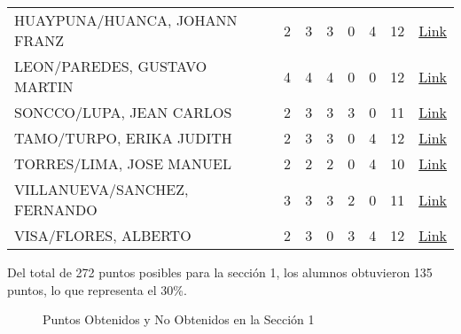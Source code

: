 \documentclass[11pt,fleqn]{book} %
\begin{document}
\begin{table}[]
\begin{tabular}{llllllll}
		HUAYPUNA/HUANCA, JOHANN FRANZ       & 2           & 3           & 3           & 0           & 4           & 12            & \href{https://drive.google.com/open?id=1WYgqT2JCTGtzgXqbM5qQqxSmqwJcihF1}{Link}               \\
		LEON/PAREDES, GUSTAVO MARTIN        & 4           & 4           & 4           & 0           & 0           & 12            & \href{https://drive.google.com/open?id=1WYgqT2JCTGtzgXqbM5qQqxSmqwJcihF1}{Link}               \\
		SONCCO/LUPA, JEAN CARLOS            & 2           & 3           & 3           & 3           & 0           & 11            & \href{https://drive.google.com/open?id=1WYgqT2JCTGtzgXqbM5qQqxSmqwJcihF1}{Link}               \\
		TAMO/TURPO, ERIKA JUDITH            & 2           & 3           & 3           & 0           & 4           & 12            & \href{https://drive.google.com/open?id=1WYgqT2JCTGtzgXqbM5qQqxSmqwJcihF1}{Link}               \\
		TORRES/LIMA, JOSE MANUEL            & 2           & 2           & 2           & 0           & 4           & 10            & \href{https://drive.google.com/open?id=1WYgqT2JCTGtzgXqbM5qQqxSmqwJcihF1}{Link}               \\
		VILLANUEVA/SANCHEZ, FERNANDO & 3           & 3           & 3           & 2           & 0           & 11            & \href{https://drive.google.com/open?id=1WYgqT2JCTGtzgXqbM5qQqxSmqwJcihF1}{Link}               \\
		VISA/FLORES, ALBERTO                & 2           & 3           & 0           & 3           & 4           & 12            & \href{https://drive.google.com/open?id=1WYgqT2JCTGtzgXqbM5qQqxSmqwJcihF1}{Link}      \\
		\hline        
	\end{tabular}
\end{table}

\newpage

Del total de 272 puntos posibles para la sección 1, los alumnos obtuvieron 135 puntos, lo que representa el 30\%.

\begin{figure}[h]
\centering
{}
\caption{Puntos Obtenidos y No Obtenidos en la Sección 1}
\end{figure}
\end{document}

